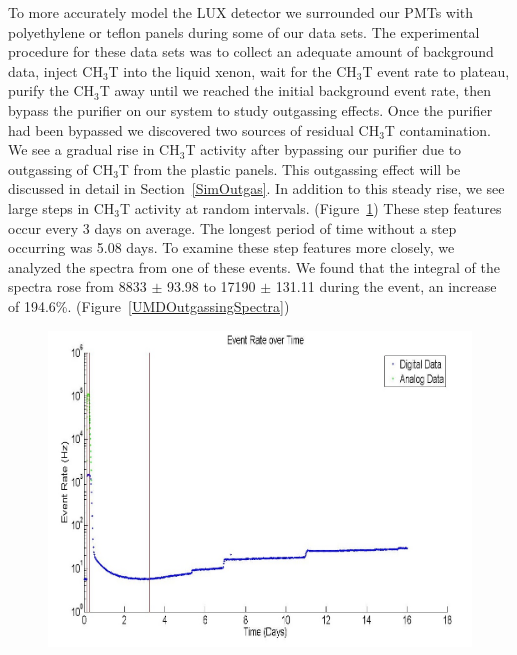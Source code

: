 To more accurately model the LUX detector we surrounded our PMTs with polyethylene or teflon panels during some of our data sets. The experimental procedure for these data sets was to collect an adequate amount of background data, inject CH$_3$T into the liquid xenon, wait for the CH$_3$T event rate to plateau, purify the CH$_3$T away until we reached the initial background event rate, then bypass the purifier on our system to study outgassing effects. Once the purifier had been bypassed we discovered two sources of residual CH$_3$T contamination. We see a gradual rise in CH$_3$T activity after bypassing our purifier due to outgassing of CH$_3$T from the plastic panels.  This outgassing effect will be discussed in detail in Section~\ref{SimOutgas}. In addition to this steady rise, we see large steps in CH$_3$T activity at random intervals. (Figure~\ref{UMDOutgassing}) These step features occur every 3 days on average. The longest period of time without a step occurring was 5.08 days. To examine these step features more closely, we analyzed the spectra from one of these events. We found that the integral of the spectra rose from 8833 $\pm$ 93.98 to 17190 $\pm$ 131.11 during the event, an increase of 194.6\%. (Figure~\ref{UMDOutgassingSpectra})

\begin{figure}
\includegraphics[scale=.35]{Outgassing_TimeHisto_Log.jpg} 
\label{UMDOutgassing}
\end{figure}

